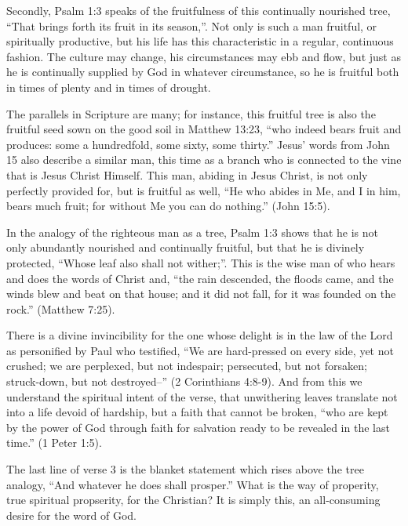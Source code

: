 \documentclass[a5paper]{book}
\begin{document}
Secondly, Psalm 1:3 speaks of the fruitfulness of this continually nourished tree,
    ``That brings forth its fruit in its season,''.
Not only is such a man fruitful, or spiritually productive,
    but his life has this characteristic in a regular, continuous fashion.
The culture may change, his circumstances may ebb and flow,
    but just as he is continually supplied by God in whatever circumstance,
    so he is fruitful both in times of plenty and in times of drought.

The parallels in Scripture are many;
    for instance, this fruitful tree is also
    the fruitful seed sown on the good soil in Matthew 13:23,
    ``who indeed bears fruit and produces:
    some a hundredfold, some sixty, some thirty.''
Jesus' words from John 15 also describe a similar man,
    this time as a branch who is connected to the vine that is Jesus Christ Himself.
This man, abiding in Jesus Christ, is not only perfectly provided for, 
    but is fruitful as well, 
    ``He who abides in Me, and I in him, 
    bears much fruit; for without Me you can do nothing.'' (John 15:5).

In the analogy of the righteous man as a tree, 
    Psalm 1:3 shows that he is not only 
    abundantly nourished and continually fruitful,
    but that he is divinely protected,
    ``Whose leaf also shall not wither;''.
This is the wise man of who hears and does the words of Christ
    and, ``the rain descended, the floods came, and the winds blew and beat 
    on that house; and it did not fall, for it was founded on the rock.''
    (Matthew 7:25).

There is a divine invincibility for the one whose delight is in
    the law of the Lord as personified by Paul who testified,
    ``We are hard-pressed on every side, yet not crushed;
    we are perplexed, but not indespair;
    persecuted, but not forsaken;
    struck-down, but not destroyed--'' (2 Corinthians 4:8-9).
And from this we understand the spiritual intent of the verse,
    that unwithering leaves translate not into a life devoid of hardship,
    but a faith that cannot be broken,
    ``who are kept by the power of God through faith for salvation ready
    to be revealed in the last time.'' (1 Peter 1:5).

The last line of verse 3 is the blanket statement
    which rises above the tree analogy,
    ``And whatever he does shall prosper.''
What is the way of properity, true spiritual propserity,
    for the Christian?
It is simply this, an all-consuming desire for the word of God.
\end{document}
